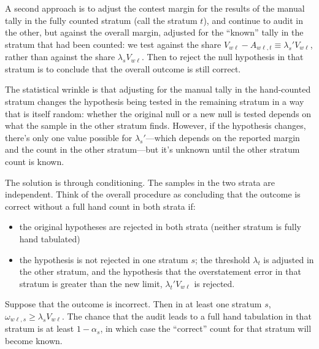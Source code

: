 A second approach is to adjust the contest margin for the results of the manual tally in the
fully counted stratum (call the stratum $t$), and continue to audit in the other, 
but against the overall margin, adjusted for the ``known'' tally in the stratum that had 
been counted: we test against the share $V_{w\ell} - A_{w\ell,t} \equiv \lambda_s' V_{w\ell}$, rather than 
against the share $\lambda_s V_{w\ell}$.
Then to reject the null hypothesis in that stratum is to conclude that the overall outcome is still correct.

The statistical wrinkle is that adjusting for the manual tally in the hand-counted stratum 
changes the hypothesis being tested in the remaining
stratum in a way that is itself random:
whether the original null or a new null is tested depends on what the sample in the other stratum
finds.
However, if the hypothesis changes, there's only one value possible for $\lambda_s'$---which
depends on the reported margin and the count in the other stratum---but it's unknown 
until the other stratum count is known.

The solution is through conditioning. 
The samples in the two strata are independent. 
Think of the overall procedure as concluding that the outcome is correct without a full
hand count in both strata if:

\begin{itemize}
   \item the original hypotheses are rejected in both strata (neither stratum is fully hand tabulated)
   \item the hypothesis is not rejected in one stratum $s$; the threshold $\lambda_t$
            is adjusted in the other stratum, and the hypothesis that the overstatement error
            in that stratum is greater than the new limit, $\lambda_t' V_{w\ell}$ is rejected. 
\end{itemize}

Suppose that the outcome is incorrect. 
Then in at least one stratum $s$, $\omega_{w\ell,s}\ge \lambda_s V_{w\ell}$.
The chance that the audit leads to a full hand tabulation in that stratum is at least $1-\alpha_s$,
in which case the ``correct'' count for that stratum will become known.

